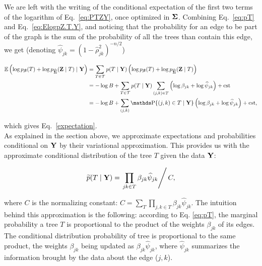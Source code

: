 We are left with the writing of the conditional expectation of the first two terms of the logarithm of Eq.~\eqref{eq:PTZY}, once optimized in ${\boldsymbol{\Sigma}}$. Combining Eq.~\eqref{eq:pT} and Eq.~\eqref{eq:ElogpZ.T.Y}, and noticing that the probability for an edge to be part of the graph is the sum of the probability of all the trees than contain this edge, we get (denoting $\widehat{\psi}_{jk} = (1- \widehat{\rho}_{jk}^2)^{-n/2}$)

\begin{align*}
    \Esp\left(\log p_\betab (T) + \log p_{\widehat{\Sigmab}}(\Zb \mid T) \mid \Yb\right)
    & = \sum_{T \in \Tcal} p(T \mid \Yb) \left(\log p_\betab(T) + \log p_{\widehat{\Sigmab}}(\Zb \mid T) \right) \\
    & = -\log B + \sum_{T \in \Tcal} p(T \mid \Yb) \sum_{(j, k) \in T} \left(\log \beta_{jk} +\log \widehat{\psi}_{jk} \right) + \text{cst} \\
    & = -\log B + \sum_{(j, k)} \prob\{(j, k) \in T \mid \Yb\} \left(\log \beta_{jk} + \log \widehat{\psi}_{jk} \right) + \text{cst},
\end{align*}
 
which gives Eq.~\eqref{expectation}.\\
 
As explained in the section above, we approximate expectations and probabilities conditional on ${\bf Y}$ by their variational approximation.
This provides us with the approximate conditional distribution of the tree $T$ given the data ${\bf Y}$:
 
$$
\widetilde{p}(T  \mid  {\bf Y}) = \left. \prod_{jk \in T} \beta_{jk} \widehat{\psi}_{jk}  \right/ C,
$$
 
where $C$ is the normalizing constant: $C = \sum_T \prod_{j, k \in T} \beta_{jk} \widehat{\psi}_{jk}$. The intuition behind this approximation is the following: according to Eq. \eqref{eq:pT}, the marginal probability a tree $T$ is proportional to the product of the weights $\beta_{jk}$ of its edges. The conditional distribution probability of tree is proportional to the same product, the weights $\beta_{jk}$ being updated as $\beta_{jk} \widehat{\psi}_{jk}$, where $\widehat{\psi}_{jk}$ summarizes the information brought by the data about the edge ($j, k$).



